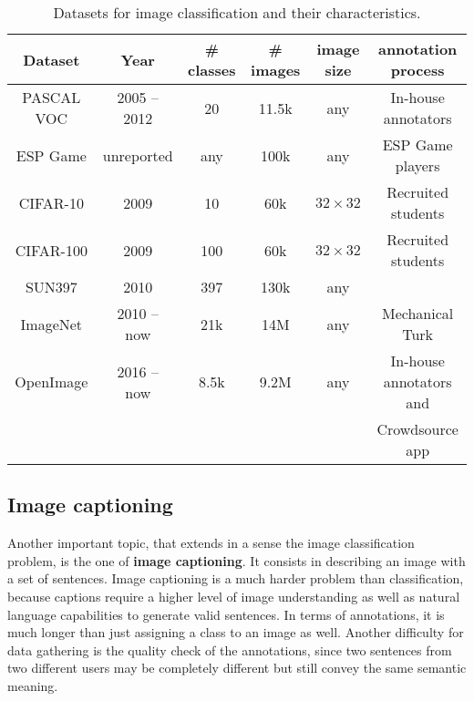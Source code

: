 \vspace{0.5cm}
\begin{table}
	\centering
	\caption{Datasets for image classification and their characteristics.}
	\begin{tabular}{|c|c|c|c|c|c|}
		\hline
		Dataset & Year & \# classes & \# images & image size & annotation process \\
		\hline
		PASCAL VOC \cite{Everingham10} & 2005 -- 2012 & 20 & 11.5k & any & In-house annotators \\
		ESP Game \cite{von2005esp} & unreported & any & 100k & any & ESP Game players \\
		CIFAR-10 \cite{krizhevsky2009learning} & 2009 & 10 & 60k & $32 \times 32$ & Recruited students \\
		CIFAR-100 \cite{krizhevsky2009learning} & 2009 & 100 & 60k & $32 \times 32$ & Recruited students \\
		SUN397 \cite{xiao2010sun} & 2010 & 397 & 130k & any &  \\
		ImageNet \cite{ILSVRC15} & 2010 -- now & 21k & 14M & any & Mechanical Turk \\
		OpenImage \cite{OpenImages, OpenImages2} & 2016 -- now & 8.5k & 9.2M & any & In-house annotators and \\
& & & & & Crowdsource app\\
		\hline
	\end{tabular}
	\label{tab:classification_ds}
\end{table}
\vspace{0.5cm}

\subsection{Image captioning}

Another important topic, that extends in a sense the image classification problem, is the one of \textbf{image captioning}. It consists in describing an image with a set of sentences. Image captioning is a much harder problem than classification, because captions require a higher level of image understanding as well as natural language capabilities to generate valid sentences. In terms of annotations, it is much longer than just assigning a class to an image as well. Another difficulty for data gathering is the quality check of the annotations, since two sentences from two different users may be completely different but still convey the same semantic meaning. 

\vspace{0.5cm}

